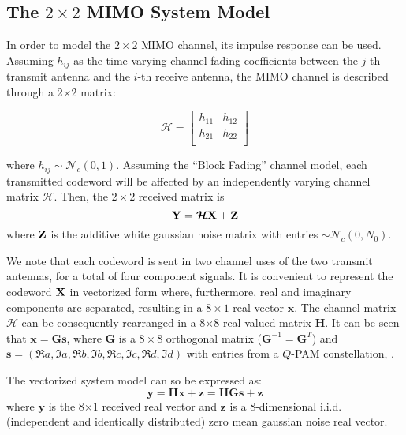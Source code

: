 \documentclass[12pt,onecolumn,draftclsnofoot]{IEEEtran}
\begin{document}
\subsection{The $2\times 2$ MIMO System Model}
In order to model the $2 \times 2$
MIMO channel, its impulse response can be used. Assuming
$h_{ij}$ as the time-varying channel fading coefficients between the
$j$-th transmit antenna and the $i$-th receive antenna, the
MIMO channel is described through a 2$\times$2 matrix:

\begin{equation}
\boldsymbol{\mathcal{H}} = \left[ \begin{array}{ll}
       h_{11} & h_{12} \\
       h_{21} & h_{22} \\
\end{array} \right]
\end{equation}

\noindent where $h_{ij} \sim \mathcal{N}_c(0,1)$.
Assuming the ``Block Fading'' channel model, each transmitted codeword will be
affected by an independently varying channel matrix $\boldsymbol{\mathcal{H}}$.
Then, the $2 \times 2$ received matrix is
\[
{\bf Y} = \boldsymbol{\mathcal{H}} {\bf X} + {\bf Z}
\]
where ${\bf Z}$ is the additive white gaussian noise matrix with entries
$\sim \mathcal{N}_c(0,N_0)$.

We note that each codeword is sent in two channel uses of the two
transmit antennas, for a total of four component signals. It is
convenient to represent the codeword ${\bf X}$ in vectorized form
where, furthermore, real and imaginary components are separated,
resulting in a $8 \times 1$ real vector $\boldsymbol{x}$. The channel
matrix $\boldsymbol{\mathcal H}$ can be consequently rearranged in a
8$\times$8 real-valued matrix $\boldsymbol{H}$. It can be seen that
$\boldsymbol{x} = \boldsymbol{G}\boldsymbol{s}$, where
$\boldsymbol{G}$ is a $8 \times 8$ orthogonal matrix
($\boldsymbol{G}^{-1}=\boldsymbol{G}^T$) and $\boldsymbol{s}=(\Re
a,\Im a,\Re b,\Im b,\Re c,\Im c,\Re d,\Im d)$ with entries from a
$Q$-PAM constellation, \cite{GoldenPage}.

The vectorized system model can so be expressed as:
\begin{equation}
\label{model_Golden}
  \boldsymbol{y}= \boldsymbol{H x}+\boldsymbol{z} = \boldsymbol{HGs}+\boldsymbol{z}
\end{equation}
\noindent where $\boldsymbol{y}$ is the 8$\times$1 received real vector and
$\boldsymbol{z}$ is a 8-dimensional i.i.d. (independent and identically 
distributed) zero
mean gaussian noise real vector.
\end{document}
